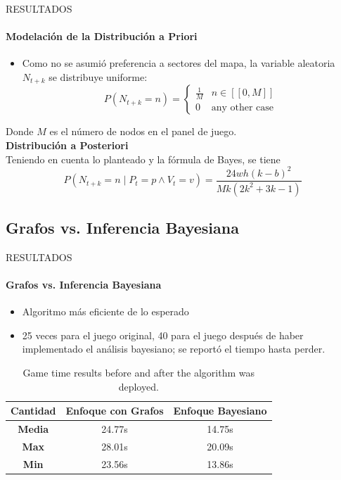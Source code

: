 \begin{frame}{RESULTADOS}
    \framesubtitle{Modelación de la Distribución a Priori}
    \begin{itemize}
        \item Como no se asumió preferencia a sectores del mapa, la variable aleatoria $N_{t+k}$ se distribuye uniforme:
        \begin{equation}
            P\left( N_{t+k}=n \right)=
            \begin{cases}
            \frac{1}{M} &  n\in[[0,M]]\\
            0 & \text{any other case}
            \end{cases}
        \end{equation}
    \end{itemize}
    Donde $M$ es el número de nodos en el panel de juego.\\
\vspace{1cm}
    \textbf{Distribución a Posteriori\\}
    Teniendo en cuenta lo planteado y la fórmula de Bayes, se tiene
    \begin{equation}
        P({ N }_{ t+k }=n\mid { P }_{ t }=p\wedge { V }_{ t}=v)=\frac{24wh(k-b)^2}{Mk(2k^2 + 3k-1)}
    \end{equation}
\end{frame}

\subsection{Grafos vs. Inferencia Bayesiana}
\begin{frame}{RESULTADOS}
    \framesubtitle{Grafos vs. Inferencia Bayesiana}
    \begin{itemize}
        \item Algoritmo más eficiente de lo esperado
        \item 25 veces para el juego original, 40 para el juego después de haber implementado el análisis bayesiano; se reportó el tiempo hasta perder.
    \end{itemize}
    \begin{table}[H]
\centering
\caption{Game time results before and after the algorithm was deployed.}
\label{tab:timeresults}
\begin{tabular}{ccc}
\hline
\textbf{Cantidad} & \textbf{Enfoque con Grafos} & \textbf{Enfoque Bayesiano} \\ \hline
\textbf{Media}     & 24.77s                   & 14.75s                      \\
\textbf{Max}      & 28.01s                   & 20.09s                      \\
\textbf{Min}      & 23.56s                   & 13.86s                     \\ \hline
\end{tabular}
\end{table}
\end{frame}

